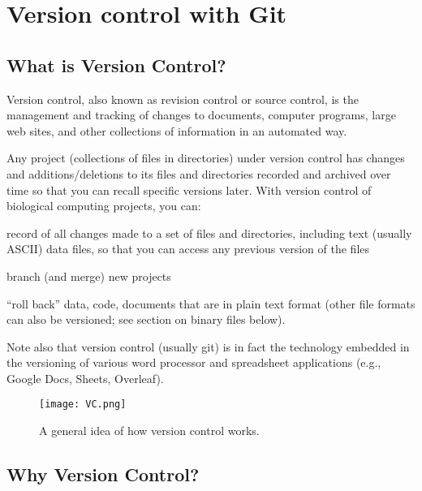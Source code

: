 \chapter{Version control with Git}
\label{chap:git}

\section{What is Version Control?}

Version control, also known as revision control or source control, is 
the management and tracking of changes to documents, computer programs, 
large web sites, and other collections of information in an automated 
way.

Any project (collections of files in directories) under version control 
has changes and additions/deletions to its files and directories 
recorded and archived over time so that you can recall specific 
versions later. With version control of biological computing projects, 
you can:

 \begin{compactitem}\itemsep10pt{}
 
		\item record of all changes made to a set of files and directories, 
		including text (usually ASCII) data files, so that you can access 
		any previous version of the files

    \item branch (and merge) new projects

		\item ``roll back'' data, code, documents that are in plain text 
		format (other file formats can also be versioned; see section on 
		binary files below). 
	
	\end{compactitem}
 
Note also that version control (usually git) is in fact the technology 
embedded in the versioning of various word processor and  
spreadsheet applications (e.g., Google Docs, Sheets, Overleaf). 

\begin{figure} \centering
  \texttt{[image: VC.png]}
  \caption{A general idea of how version control works.}
\end{figure}

\section{Why Version Control?}


